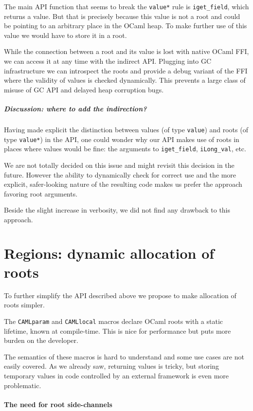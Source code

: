 \documentclass[a4paper]{easychair}
\begin{document}
The main API function that seems to break the \texttt{value*} rule is
\texttt{iget\_field}, which returns a value. But that is precisely
because this value is not a root and could be pointing to an arbitrary
place in the OCaml heap. To make further use of this value we would have
to store it in a root.

While the connection between a root and its value is lost with native
OCaml FFI, we can access it at any time with the indirect API. Plugging
into GC infrastructure we can introspect the roots and provide a debug
variant of the FFI where the validity of values is checked dynamically.
This prevents a large class of misuse of GC API and delayed heap
corruption bugs.

\subparagraph{Discussion: where to add the indirection?}

Having made explicit the distinction between values (of type
\texttt{value}) and roots (of type \texttt{value*}) in the API, one
could wonder why our API makes use of roots in places where values would
be fine: the arguments to \texttt{iget\_field}, \texttt{iLong\_val},
etc.

We are not totally decided on this issue and might revisit this decision
in the future. However the ability to dynamically check for correct use
and the more explicit, safer-looking nature of the resulting code makes
us prefer the approach favoring root arguments.

Beside the slight increase in verbosity, we did not find any drawback to
this approach.

\section{Regions: dynamic allocation of roots}

To further simplify the API described above we propose to make
allocation of roots simpler.

The \texttt{CAMLparam} and \texttt{CAMLlocal} macros declare OCaml roots
with a static lifetime, known at compile-time. This is nice for
performance but puts more burden on the developer.

The semantics of these macros is hard to understand and some use cases
are not easily covered. As we already saw, returning values is tricky,
but storing temporary values in code controlled by an external framework
is even more problematic.

\paragraph{The need for root side-channels}
\end{document}
